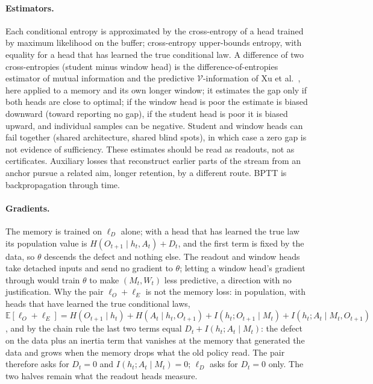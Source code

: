 \documentclass[11pt]{article}
\theoremstyle{plain}
\theoremstyle{definition}
\theoremstyle{remark}
\newcommand{\E}{\mathbb{E}}
\begin{document}
\paragraph{Estimators.} Each conditional entropy is approximated by the cross-entropy of a head trained by maximum likelihood on the buffer; cross-entropy upper-bounds entropy, with equality for a head that has learned the true conditional law. A difference of two cross-entropies (student minus window head) is the difference-of-entropies estimator of mutual information \cite{mcallester2020formal} and the predictive $\mathcal{V}$-information of Xu et al.\ \cite{xu2020theory}, here applied to a memory and its own longer window; it estimates the gap only if both heads are close to optimal; if the window head is poor the estimate is biased downward (toward reporting no gap), if the student head is poor it is biased upward, and individual samples can be negative. Student and window heads can fail together (shared architecture, shared blind spots), in which case a zero gap is not evidence of sufficiency. These estimates should be read as readouts, not as certificates. Auxiliary losses that reconstruct earlier parts of the stream from an anchor \cite{trinh2018learning} pursue a related aim, longer retention, by a different route. BPTT is backpropagation through time.

\paragraph{Gradients.} The memory is trained on $\ell_D$ alone; with a head that has learned the true law its population value is $H(O_{t+1} \mid h_t, A_t) + D_t$, and the first term is fixed by the data, so $\theta$ descends the defect and nothing else. The readout and window heads take detached inputs and send no gradient to $\theta$; letting a window head's gradient through would train $\theta$ to make $(M_t, W_t)$ less predictive, a direction with no justification. Why the pair $\ell_O + \ell_E$ is not the memory loss: in population, with heads that have learned the true conditional laws, $\E[\ell_O + \ell_E] = H(O_{t+1} \mid h_t) + H(A_t \mid h_t, O_{t+1}) + I(h_t; O_{t+1} \mid M_t) + I(h_t; A_t \mid M_t, O_{t+1})$, and by the chain rule the last two terms equal $D_t + I(h_t; A_t \mid M_t)$: the defect on the data plus an inertia term that vanishes at the memory that generated the data and grows when the memory drops what the old policy read. The pair therefore asks for $D_t = 0$ and $I(h_t; A_t \mid M_t) = 0$; $\ell_D$ asks for $D_t = 0$ only. The two halves remain what the readout heads measure.
\end{document}
